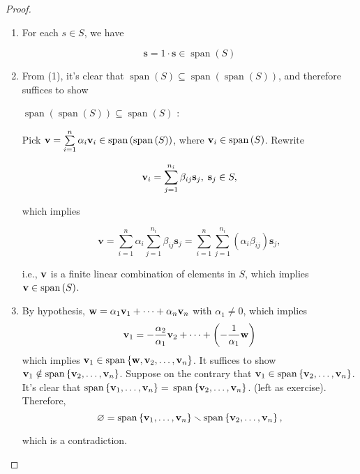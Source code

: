\begin{proof} 
\begin{enumerate}
    \item For each \(s \in  S\), we have

\[
\mathbf{s} = 1 \cdot  \mathbf{s} \in  \operatorname{span}\left( S\right)
\]

    \item From (1), it’s clear that \(\operatorname{span}\left( S\right)  \subseteq  \operatorname{span}\left( {\operatorname{span}\left( S\right) }\right)\), and therefore suffices to show

\(\operatorname{span}\left( {\operatorname{span}\left( S\right) }\right)  \subseteq  \operatorname{span}\left( S\right)\) :

Pick \(\mathbf{v} = \mathop{\sum }\limits_{{i = 1}}^n\alpha_{i}{\bf v}_{i} \in  \operatorname{span}\left( {\operatorname{span}\left( S\right) }\right)\), where \({\bf v}_{i} \in  \operatorname{span}\left( S\right)\). Rewrite

\[
{\bf v}_{i} = \mathop{\sum }\limits_{{j = 1}}^{n_{i}}\beta_{ij}{\mathbf{s}}_{j},\;{\mathbf{s}}_{j} \in  S,
\]

which implies

\[
\mathbf{v} = \mathop{\sum }\limits_{{i = 1}}^n\alpha_{i}\mathop{\sum }\limits_{{j = 1}}^{n_{i}}\beta_{ij}{\mathbf{s}}_{j} = \mathop{\sum }\limits_{{i = 1}}^n\mathop{\sum }\limits_{{j = 1}}^{n_{i}}\left( {\alpha_{i}\beta_{ij}}\right) {\mathbf{s}}_{j},
\]

i.e., \(\bf v\) is a finite linear combination of elements in \(S\), which implies \({\bf v} \in  \operatorname{span}\left( S\right)\).

    \item  By hypothesis, \(\mathbf{w} = \alpha_1{\bf v}_1 + \cdots  + \alpha_n{\bf v}_n\) with \(\alpha_1 \neq  0\), which implies
    \[
    {\bf v}_1 =  - \frac{\alpha_2}{\alpha_1}{\bf v}_2 + \cdots  + \left( {-\frac1{\alpha_1}\mathbf{w}}\right)
    \]
    which implies \({\bf v}_1 \in  \operatorname{span}\left\{  {\mathbf{w},{\bf v}_2,\ldots ,{\bf v}_n}\right\}\). It suffices to show \({\bf v}_1 \notin  \operatorname{span}\left\{  {{\bf v}_2,\ldots ,{\bf v}_n}\right\}\). Suppose on the contrary that \({\bf v}_1 \in  \operatorname{span}\left\{  {{\bf v}_2,\ldots ,{\bf v}_n}\right\}\). It’s clear that \(\operatorname{span}\left\{  {{\bf v}_1,\ldots ,{\bf v}_n}\right\}   =\)  \(\operatorname{span}\left\{  {{\bf v}_2,\ldots ,{\bf v}_n}\right\}\). (left as exercise). Therefore,
    \[
    \varnothing  = \operatorname{span}\left\{  {{\bf v}_1,\ldots ,{\bf v}_n}\right\}   \smallsetminus  \operatorname{span}\left\{  {{\bf v}_2,\ldots ,{\bf v}_n}\right\}  ,
    \]
    
    which is a contradiction.
\end{enumerate}

\end{proof}

